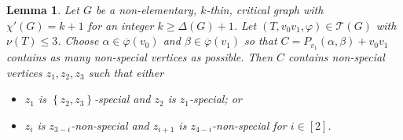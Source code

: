 \documentclass[12pt]{amsart}
\theoremstyle{plain}
\newtheorem{lem}[thm]{Lemma}
\theoremstyle{definition}
\theoremstyle{remark}
\newcommand{\fancy}[1]{\mathcal{#1}}
\newcommand{\T}{\fancy{T}}
\newcommand{\set}[1]{\left\{ #1 \right\}}
\newcommand{\irange}[1]{\left[#1\right]}
\newcommand{\vph}{\varphi}
\newcommand{\vphn}{\overline{\varphi}}
\begin{document}
\begin{lem}\label{MasterHelper}
Let $G$ be a non-elementary, $k$-thin, critical graph with $\chi'(G) = k+1$ for an integer $k \ge \Delta(G) + 1$.
Let $(T, v_0v_1, \vph) \in \T(G)$ with $\nu(T) \le 3$. Choose $\alpha \in \vphn(v_0)$ and $\beta \in \vphn(v_1)$ so that $C = P_{v_1}(\alpha, \beta) + v_0v_1$ contains as many non-special vertices as possible.  
Then $C$ contains non-special vertices $z_1,z_2,z_3$ such that either 
\begin{itemize}
\item $z_1$ is $\set{z_2,z_3}$-special and $z_2$ is $z_1$-special; or
\item $z_i$ is $z_{3-i}$-non-special and $z_{i+1}$ is $z_{4-i}$-non-special for $i \in \irange{2}$.
\end{itemize}
\end{lem}
\end{document}
